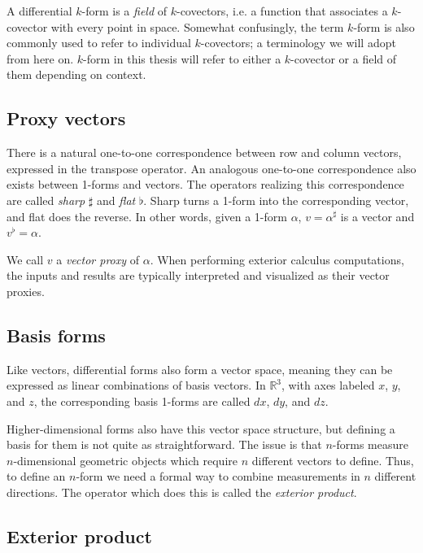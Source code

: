 \documentclass[utf8,english]{gradu3}
\begin{document}
A differential $k$-form is a \textit{field} of $k$-covectors,
i.e. a function that associates a $k$-covector with every point in space.
Somewhat confusingly, the term $k$-form is also commonly used to
refer to individual $k$-covectors;
a terminology we will adopt from here on.
$k$-form in this thesis will refer to either a $k$-covector
or a field of them depending on context.


\subsection{Proxy vectors}

There is a natural one-to-one correspondence between row and column vectors,
expressed in the transpose operator.
An analogous one-to-one correspondence also exists between 1-forms and vectors.
The operators realizing this correspondence are called
\textit{sharp} $\sharp$ and \textit{flat} $\flat$.
Sharp turns a 1-form into the corresponding vector,
and flat does the reverse.
In other words, given a 1-form $\alpha$,
$v = \alpha^{\sharp}$ is a vector and $v^{\flat} = \alpha$.

We call $v$ a \textit{vector proxy} of $\alpha$.
When performing exterior calculus computations,
the inputs and results are typically interpreted
and visualized as their vector proxies.


\subsection{Basis forms}

Like vectors, differential forms also form a vector space,
meaning they can be expressed as linear combinations of basis vectors.
In $\mathbb{R}^3$, with axes labeled $x$, $y$, and $z$,
the corresponding basis 1-forms are called $dx$, $dy$, and $dz$.

Higher-dimensional forms also have this vector space structure,
but defining a basis for them is not quite as straightforward.
The issue is that $n$-forms measure $n$-dimensional geometric objects
which require $n$ different vectors to define.
Thus, to define an $n$-form we need a formal way to combine
measurements in $n$ different directions.
The operator which does this is called the \textit{exterior product}.


\subsection{Exterior product}
\end{document}
